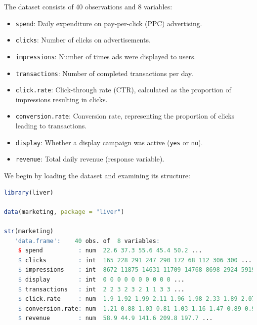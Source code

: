 \documentclass[
]{book}
\newcommand{\passthrough}[1]{#1}
\providecommand{\tightlist}{%
  \setlength{\itemsep}{0pt}\setlength{\parskip}{0pt}}
\theoremstyle{definition}
\theoremstyle{definition}
\theoremstyle{definition}
\theoremstyle{definition}
\theoremstyle{remark}
\begin{document}
The dataset consists of 40 observations and 8 variables:

\begin{itemize}
\tightlist
\item
  \passthrough{\lstinline!spend!}: Daily expenditure on pay-per-click (PPC) advertising.\\
\item
  \passthrough{\lstinline!clicks!}: Number of clicks on advertisements.\\
\item
  \passthrough{\lstinline!impressions!}: Number of times ads were displayed to users.\\
\item
  \passthrough{\lstinline!transactions!}: Number of completed transactions per day.\\
\item
  \passthrough{\lstinline!click.rate!}: Click-through rate (CTR), calculated as the proportion of impressions resulting in clicks.\\
\item
  \passthrough{\lstinline!conversion.rate!}: Conversion rate, representing the proportion of clicks leading to transactions.\\
\item
  \passthrough{\lstinline!display!}: Whether a display campaign was active (\passthrough{\lstinline!yes!} or \passthrough{\lstinline!no!}).\\
\item
  \passthrough{\lstinline!revenue!}: Total daily revenue (response variable).
\end{itemize}

We begin by loading the dataset and examining its structure:

\begin{lstlisting}[language=R]
library(liver)

data(marketing, package = "liver")

str(marketing)
   'data.frame':    40 obs. of  8 variables:
    $ spend          : num  22.6 37.3 55.6 45.4 50.2 ...
    $ clicks         : int  165 228 291 247 290 172 68 112 306 300 ...
    $ impressions    : int  8672 11875 14631 11709 14768 8698 2924 5919 14789 14818 ...
    $ display        : int  0 0 0 0 0 0 0 0 0 0 ...
    $ transactions   : int  2 2 3 2 3 2 1 1 3 3 ...
    $ click.rate     : num  1.9 1.92 1.99 2.11 1.96 1.98 2.33 1.89 2.07 2.02 ...
    $ conversion.rate: num  1.21 0.88 1.03 0.81 1.03 1.16 1.47 0.89 0.98 1 ...
    $ revenue        : num  58.9 44.9 141.6 209.8 197.7 ...
\end{lstlisting}
\end{document}
